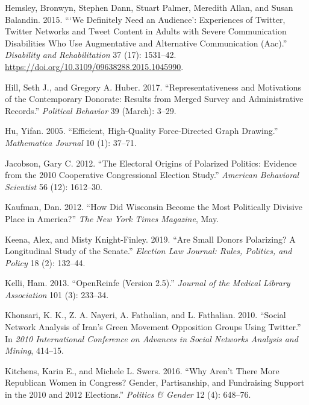 \documentclass[12pt,]{article}
\begin{document}
\leavevmode\hypertarget{ref-hemsley2015}{}%
Hemsley, Bronwyn, Stephen Dann, Stuart Palmer, Meredith Allan, and Susan
Balandin. 2015. ```We Definitely Need an Audience': Experiences of
Twitter, Twitter Networks and Tweet Content in Adults with Severe
Communication Disabilities Who Use Augmentative and Alternative
Communication (Aac).'' \emph{Disability and Rehabilitation} 37 (17):
1531--42. \url{https://doi.org/10.3109/09638288.2015.1045990}.

\leavevmode\hypertarget{ref-hill2017}{}%
Hill, Seth J., and Gregory A. Huber. 2017. ``Representativeness and
Motivations of the Contemporary Donorate: Results from Merged Survey and
Administrative Records.'' \emph{Political Behavior} 39 (March): 3--29.

\leavevmode\hypertarget{ref-yifanhu}{}%
Hu, Yifan. 2005. ``Efficient, High-Quality Force-Directed Graph
Drawing.'' \emph{Mathematica Journal} 10 (1): 37--71.

\leavevmode\hypertarget{ref-jacobson2012}{}%
Jacobson, Gary C. 2012. ``The Electoral Origins of Polarized Politics:
Evidence from the 2010 Cooperative Congressional Election Study.''
\emph{American Behavioral Scientist} 56 (12): 1612--30.

\leavevmode\hypertarget{ref-kaufman2012}{}%
Kaufman, Dan. 2012. ``How Did Wisconsin Become the Most Politically
Divisive Place in America?'' \emph{The New York Times Magazine}, May.

\leavevmode\hypertarget{ref-keena2019}{}%
Keena, Alex, and Misty Knight-Finley. 2019. ``Are Small Donors
Polarizing? A Longitudinal Study of the Senate.'' \emph{Election Law
Journal: Rules, Politics, and Policy} 18 (2): 132--44.

\leavevmode\hypertarget{ref-openrefine}{}%
Kelli, Ham. 2013. ``OpenReinfe (Version 2.5).'' \emph{Journal of the
Medical Library Association} 101 (3): 233--34.

\leavevmode\hypertarget{ref-khonsari2010}{}%
Khonsari, K. K., Z. A. Nayeri, A. Fathalian, and L. Fathalian. 2010.
``Social Network Analysis of Iran's Green Movement Opposition Groups
Using Twitter.'' In \emph{2010 International Conference on Advances in
Social Networks Analysis and Mining}, 414--15.

\leavevmode\hypertarget{ref-kitchens2016}{}%
Kitchens, Karin E., and Michele L. Swers. 2016. ``Why Aren't There More
Republican Women in Congress? Gender, Partisanship, and Fundraising
Support in the 2010 and 2012 Elections.'' \emph{Politics \& Gender} 12
(4): 648--76.
\end{document}
